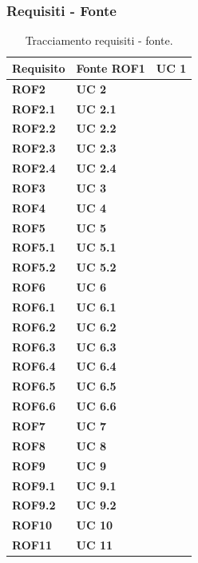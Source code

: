 \subsubsection{Requisiti - Fonte}
\begin{longtable}{ |p{3cm}|p{3cm}|  }
    \caption{Tracciamento requisiti - fonte.}
    \label{tab:req-tracciamento-inverso}
    \hline
    \textbf{Requisito} & \textbf{Fonte}
    \hline
    \textbf{ROF1}   &   \textbf{UC 1}   \\ \hline
    \textbf{ROF2}   &   \textbf{UC 2}   \\ \hline
    \textbf{ROF2.1} &   \textbf{UC 2.1} \\ \hline
    \textbf{ROF2.2} &   \textbf{UC 2.2} \\ \hline
    \textbf{ROF2.3} &   \textbf{UC 2.3} \\ \hline
    \textbf{ROF2.4} &   \textbf{UC 2.4} \\ \hline
    \textbf{ROF3}   &   \textbf{UC 3}   \\ \hline
    \textbf{ROF4}   &   \textbf{UC 4}   \\ \hline
    \textbf{ROF5}   &   \textbf{UC 5}   \\ \hline
    \textbf{ROF5.1} &   \textbf{UC 5.1} \\ \hline
    \textbf{ROF5.2} &   \textbf{UC 5.2} \\ \hline
    \textbf{ROF6}   &   \textbf{UC 6}   \\ \hline
    \textbf{ROF6.1} &   \textbf{UC 6.1} \\ \hline
    \textbf{ROF6.2} &   \textbf{UC 6.2} \\ \hline
    \textbf{ROF6.3} &   \textbf{UC 6.3} \\ \hline
    \textbf{ROF6.4} &   \textbf{UC 6.4} \\ \hline
    \textbf{ROF6.5} &   \textbf{UC 6.5} \\ \hline
    \textbf{ROF6.6} &   \textbf{UC 6.6} \\ \hline
    \textbf{ROF7}   &   \textbf{UC 7}   \\ \hline
    \textbf{ROF8}   &   \textbf{UC 8}   \\ \hline
    \textbf{ROF9}   &   \textbf{UC 9}   \\ \hline
    \textbf{ROF9.1} &   \textbf{UC 9.1} \\ \hline
    \textbf{ROF9.2} &   \textbf{UC 9.2} \\ \hline
    \textbf{ROF10}  &   \textbf{UC 10}  \\ \hline
    \textbf{ROF11}  &   \textbf{UC 11}  \\ \hline

\end{longtable}
